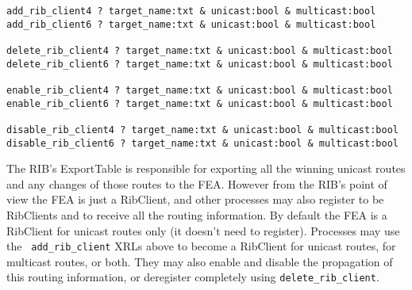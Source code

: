 \documentclass[11pt]{article}
\begin{document}
\begin{verbatim}
add_rib_client4	? target_name:txt & unicast:bool & multicast:bool
add_rib_client6	? target_name:txt & unicast:bool & multicast:bool

delete_rib_client4 ? target_name:txt & unicast:bool & multicast:bool
delete_rib_client6 ? target_name:txt & unicast:bool & multicast:bool

enable_rib_client4 ? target_name:txt & unicast:bool & multicast:bool
enable_rib_client6 ? target_name:txt & unicast:bool & multicast:bool

disable_rib_client4 ? target_name:txt & unicast:bool & multicast:bool
disable_rib_client6 ? target_name:txt & unicast:bool & multicast:bool
\end{verbatim}

The RIB's ExportTable is responsible for exporting all the winning
unicast routes and any changes of those routes to the FEA.  However
from the RIB's point of view the FEA is just a RibClient, and other
processes may also register to be RibClients and to receive all the
routing information.  By default the FEA is a RibClient for unicast
routes only (it doesn't need to register).  Processes may use the {\tt
add\_rib\_client} XRLs above to become a RibClient for unicast routes,
for multicast routes, or both.  They may also enable and disable the
propagation of this routing information, or deregister completely
using {\tt delete\_rib\_client}.
\end{document}
